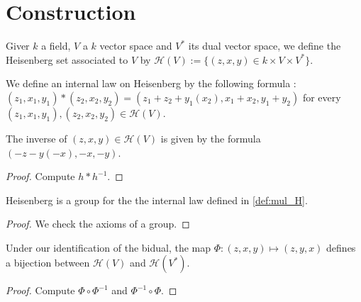 \section{Construction}

\begin{definition}
    \label{def:heisenberg}
    \leanok

    Giver $k$ a field, $V$ a $k$ vector space and $V^*$ its dual vector space,
    we define the Heisenberg set associated to $V$ by
    $\mathcal{H}(V):=\{(z,x,y) \in k\times V\times V^*\}$.
\end{definition}

\begin{definition}
    \label{def:mul_H}
    \leanok 

    We define an internal law on Heisenberg by the following formula :
    $(z_1,x_1,y_1)*(z_2,x_2,y_2) = (z_1+z_2+y_1(x_2),x_1+x_2,y_1+y_2)$ for every
     $(z_1,x_1,y_1),(z_2,x_2,y_2)\in\mathcal{H}(V)$.
\end{definition}

\begin{definition}
    \label{def:inv_H}
    \leanok 

    The inverse of $(z,x,y)\in\mathcal{H}(V)$ is given by the formula
    $(-z- y(-x), - x ,- y)$.
    \begin{proof}
        \leanok 
        Compute $h*h^{-1}$.
    \end{proof}
\end{definition}

\begin{proposition}
    \label{prop:group_H}
    \leanok
    Heisenberg is a group for the the internal law defined in \ref{def:mul_H}.
    \begin{proof}
        \leanok
        We check the axioms of a group.
    \end{proof}
\end{proposition}

\begin{definition}
    \label{def:bij_H}
    \leanok 

    Under our identification of the bidual, the map
    $\Phi : (z,x,y) \mapsto (z,y,x)$ defines a bijection 
    between $\mathcal{H}(V)$ and $\mathcal{H}(V^*)$.
    \begin{proof}
        \leanok
        Compute $\Phi\circ\Phi^{-1}$ and $\Phi^{-1}\circ\Phi$.
    \end{proof}
\end{definition}

